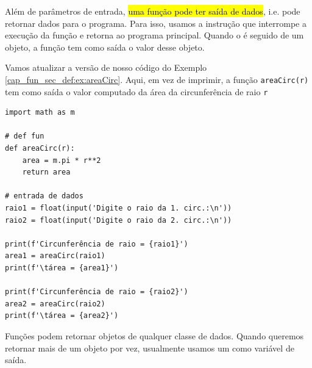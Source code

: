 Além de parâmetros de entrada, \hl{uma função pode ter saída de dados}, i.e. pode retornar dados para o programa. Para isso, usamos a instrução {\PYTHONreturn} que interrompe a execução da função e retorna ao programa principal. Quando o {\PYTHONreturn} é seguido de um objeto, a função tem como saída o valor desse objeto.

\begin{ex}
  Vamos atualizar a versão de nosso código do Exemplo \ref{cap_fun_sec_def:ex:areaCirc}. Aqui, em vez de imprimir, a função \lstinline+areaCirc(r)+ tem como saída o valor computado da área da circunferência de raio \lstinline+r+

\begin{lstlisting}
import math as m

# def fun
def areaCirc(r):
    area = m.pi * r**2
    return area
    
# entrada de dados
raio1 = float(input('Digite o raio da 1. circ.:\n'))
raio2 = float(input('Digite o raio da 2. circ.:\n'))

print(f'Circunferência de raio = {raio1}')
area1 = areaCirc(raio1)
print(f'\tárea = {area1}')

print(f'Circunferência de raio = {raio2}')
area2 = areaCirc(raio2)
print(f'\tárea = {area2}')
\end{lstlisting}

\end{ex}

Funções podem retornar objetos de qualquer classe de dados. Quando queremos retornar mais de um objeto por vez, usualmente usamos um {\PYTHONtuple} como variável de saída.

